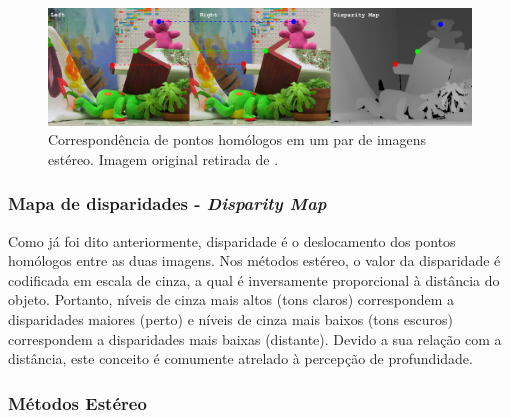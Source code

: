 \begin{figure}[H]
 	\centering
 	\includegraphics[scale=0.33]{./Resources/homologous_points_stereo.png}
 	\caption{Correspondência de pontos homólogos em um par de imagens estéreo. Imagem original retirada de \cite{Scharstein2003}.}
 	\label{homologous_points _stereo}
\end{figure}

\subsubsection{Mapa de disparidades - \textit{Disparity Map}}

Como já foi dito anteriormente, disparidade é o deslocamento dos pontos homólogos entre as duas imagens. Nos métodos estéreo, o valor da disparidade é codificada em escala de cinza, a qual é inversamente proporcional à distância do objeto. Portanto, níveis de cinza mais altos (tons claros) correspondem a disparidades maiores (perto) e níveis de cinza mais baixos (tons escuros) correspondem a disparidades mais baixas (distante). Devido a sua relação com a distância, este conceito é comumente atrelado à percepção de profundidade.

\subsubsection{Métodos Estéreo}

